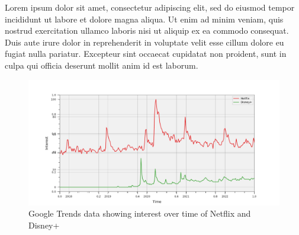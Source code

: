 
Lorem ipsum dolor sit amet, consectetur adipiscing elit, sed do eiusmod tempor incididunt ut labore et dolore magna aliqua. Ut enim ad minim veniam, quis nostrud exercitation ullamco laboris nisi ut aliquip ex ea commodo consequat. Duis aute irure dolor in reprehenderit in voluptate velit esse cillum dolore eu fugiat nulla pariatur. Excepteur sint occaecat cupidatat non proident, sunt in culpa qui officia deserunt mollit anim id est laborum. \cite{eghbal2020working}

\begin{figure}
	\includegraphics[width=\linewidth]{assets/trends.pdf}
	\caption{Google Trends data showing interest over time of Netflix and Disney+}\label{fig:trends}
\end{figure}
